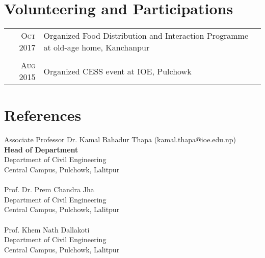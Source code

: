 \documentclass[a4paper,10pt]{article}
\begin{document}
\section{Volunteering and Participations}
\begin{tabular}{rl}	
 \textsc{Oct 2017}  & Organized Food Distribution and Interaction Programme at old-age home,
Kanchanpur \\\\
  \textsc{Aug 2015}  &Organized CESS event at IOE, Pulchowk \\
\end{tabular}

\section{References}
Associate Professor Dr. Kamal Bahadur Thapa (kamal.thapa@ioe.edu.np)\\
\textbf{Head of Department}\\
Department of Civil Engineering\\
Central Campus, Pulchowk, Lalitpur\\\\
Prof. Dr. Prem Chandra Jha\\
Department of Civil Engineering\\
Central Campus, Pulchowk, Lalitpur\\\\
Prof. Khem Nath Dallakoti\\
Department of Civil Engineering\\
Central Campus, Pulchowk, Lalitpur\\\\
\end{document}
